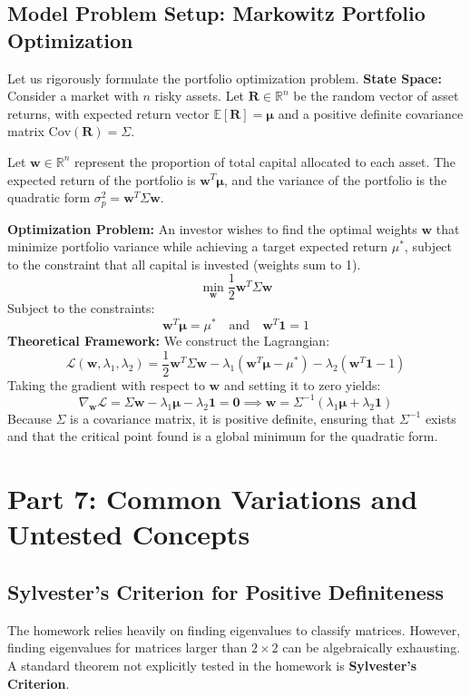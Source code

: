 \documentclass[11pt, letterpaper]{article}
\theoremstyle{definition}
\theoremstyle{remark}
\newcommand{\R}{\mathbb{R}}
\newcommand{\E}{\mathbb{E}}
\begin{document}
\subsection{Model Problem Setup: Markowitz Portfolio Optimization}
Let us rigorously formulate the portfolio optimization problem. 
\textbf{State Space:} Consider a market with $n$ risky assets. Let $\mathbf{R} \in \R^n$ be the random vector of asset returns, with expected return vector $\E[\mathbf{R}] = \boldsymbol{\mu}$ and a positive definite covariance matrix $\text{Cov}(\mathbf{R}) = \Sigma$. 

Let $\mathbf{w} \in \R^n$ represent the proportion of total capital allocated to each asset. The expected return of the portfolio is $\mathbf{w}^T \boldsymbol{\mu}$, and the variance of the portfolio is the quadratic form $\sigma_p^2 = \mathbf{w}^T \Sigma \mathbf{w}$.

\textbf{Optimization Problem:} An investor wishes to find the optimal weights $\mathbf{w}$ that minimize portfolio variance while achieving a target expected return $\mu^*$, subject to the constraint that all capital is invested (weights sum to 1).
\[
\min_{\mathbf{w}} \frac{1}{2} \mathbf{w}^T \Sigma \mathbf{w}
\]
Subject to the constraints:
\[
\mathbf{w}^T \boldsymbol{\mu} = \mu^* \quad \text{and} \quad \mathbf{w}^T \mathbf{1} = 1
\]
\textbf{Theoretical Framework:} We construct the Lagrangian:
\[
\mathcal{L}(\mathbf{w}, \lambda_1, \lambda_2) = \frac{1}{2} \mathbf{w}^T \Sigma \mathbf{w} - \lambda_1 (\mathbf{w}^T \boldsymbol{\mu} - \mu^*) - \lambda_2 (\mathbf{w}^T \mathbf{1} - 1)
\]
Taking the gradient with respect to $\mathbf{w}$ and setting it to zero yields:
\[
\nabla_{\mathbf{w}} \mathcal{L} = \Sigma \mathbf{w} - \lambda_1 \boldsymbol{\mu} - \lambda_2 \mathbf{1} = \mathbf{0} \implies \mathbf{w} = \Sigma^{-1} (\lambda_1 \boldsymbol{\mu} + \lambda_2 \mathbf{1})
\]
Because $\Sigma$ is a covariance matrix, it is positive definite, ensuring that $\Sigma^{-1}$ exists and that the critical point found is a global minimum for the quadratic form.

\newpage

\section{Part 7: Common Variations and Untested Concepts}

\subsection{Sylvester's Criterion for Positive Definiteness}
The homework relies heavily on finding eigenvalues to classify matrices. However, finding eigenvalues for matrices larger than $2 \times 2$ can be algebraically exhausting. A standard theorem not explicitly tested in the homework is \textbf{Sylvester's Criterion}.
\end{document}

